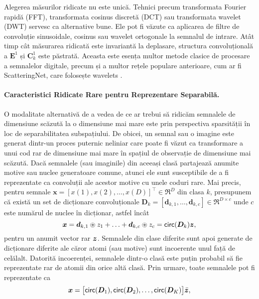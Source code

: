 \documentclass[../../book-main_ro.tex]{subfiles}
\begin{document}
Alegerea măsurilor ridicate nu este unică. Tehnici precum transformata Fourier rapidă (FFT), transformata cosinus discretă (DCT) sau transformata wavelet (DWT) servesc ca alternative bune. Ele pot fi văzute ca aplicarea de filtre de convoluție sinusoidale, cosinus sau wavelet ortogonale la semnalul de intrare. Atât timp cât măsurarea ridicată este invariantă la deplasare, structura convoluțională a $\bm E^1$ și $\bm C^1_k$ este păstrată. Aceasta este esența multor metode clasice de procesare a semnalelor digitale, precum și a multor rețele populare anterioare, cum ar fi ScatteringNet, care folosește wavelets \cite{scattering-net}.

\paragraph{Caracteristici Ridicate Rare pentru Reprezentare Separabilă.}
O modalitate alternativă de a vedea de ce ar trebui să ridicăm semnalele de dimensiune scăzută la o dimensiune mai mare este prin perspectiva sparsității în loc de separabilitatea subspațiului. De obicei, un semnal sau o imagine este generat dintr-un proces puternic neliniar care poate fi văzut ca transformare a unui cod rar de dimensiune mai mare în spațiul de observație de dimensiune mai scăzută. Dacă semnalele (sau imaginile) din aceeași clasă partajează anumite motive sau nuclee generatoare comune, atunci ele sunt susceptibile de a fi reprezentate ca convoluții ale acestor motive cu unele coduri rare. Mai precis, pentru semnale $\bm x = [x(1), x(2), \ldots, x(D)]^\top \in \Re^D$ din clasa $k$, presupunem că există un set de dicționare convoluționale $\bm D_k = [\bm d_{k,1}, \ldots, \bm d_{k,c}] \in \Re^{D\times c}$ unde $c$ este numărul de nuclee în dicționar, astfel încât
\begin{equation}
    \bm{x} = \bm d_{k,1} \circledast z_1 + \ldots + \bm d_{k,c} \circledast z_c = \mathsf{circ}(\bm{D}_k)\bm{z},
\end{equation}
pentru un anumit vector rar $\bm{z}$. Semnalele din clase diferite sunt apoi generate de dicționare diferite ale căror atomi (sau motive) sunt incoerente unul față de celălalt. Datorită incoerenței, semnalele dintr-o clasă este puțin probabil să fie reprezentate rar de atomii din orice altă clasă. Prin urmare, toate semnalele pot fi reprezentate ca
\begin{equation}
\bm{x} = \big[\mathsf{circ}(\bm{D}_1), \mathsf{circ}(\bm{D}_2), \ldots, \mathsf{circ}(\bm{D}_K)\big] \bar {\bm{z}},
\end{equation}
\end{document}
